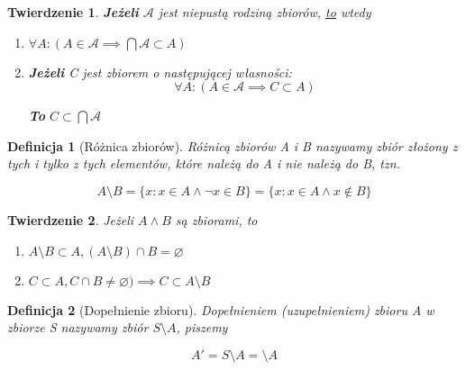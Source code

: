 \documentclass[a5paper,8pt]{article}
\theoremstyle{mythmstyle}
\newtheorem{definition}{Definicja}[section]
\newtheorem{theorem}{Twierdzenie}[section]
\newcommand\tab[1][1cm]{\hspace*{#1}}
\begin{document}
        \begin{theorem}
            \textbf{Jeżeli} $ \mathcal{A} $ jest niepustą rodziną zbiorów, \underline{to} wtedy

            \begin{enumerate}
                \item $ \forall A : ( A \in \mathcal{A} \implies \bigcap \mathcal{A} \subset A ) $

                \item \textbf{Jeżeli} C jest zbiorem o następującej własności:
                    \begin{equation*}
                        \forall A : ( A \in \mathcal{A} \implies C \subset A )
                    \end{equation*}

                    \textbf{To} \tab $ C \subset \bigcap \mathcal{A} $
            \end{enumerate}
        \end{theorem}


        \begin{definition}[Różnica zbiorów]
            Różnicą zbiorów A i B nazywamy zbiór złożony z tych i tylko z tych
            elementów, które należą do A i nie należą do B, tzn.

            \begin{equation*}
                A \setminus B = \{ x: x \in A \wedge \neg x \in B \} = \{ x: x \in A \wedge x \notin B \}
            \end{equation*}
        \end{definition}

        \begin{theorem}
            Jeżeli $ A \wedge B $ są zbiorami, to

            \begin{enumerate}
                \item $ A \setminus B \subset A, (A \setminus B) \cap B = \varnothing $

                \item $ C \subset A, C \cap B \neq \varnothing ) \implies C \subset A \setminus B $
            \end{enumerate}
        \end{theorem}

        \begin{definition}[Dopełnienie zbioru]
            Dopełnieniem (uzupełnieniem) zbioru A w zbiorze S nazywamy zbiór $ S \setminus A $, piszemy

            \begin{equation*}
                A' = S \setminus A = \setminus A
            \end{equation*}
        \end{definition}
\end{document}
